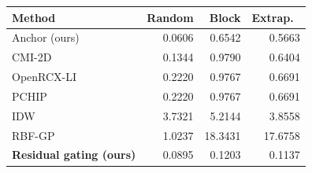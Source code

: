 \small
\begin{tabular}{lrrr}\toprule
Method & Random & Block & Extrap.\ \\\midrule
Anchor (ours) & 0.0606 & 0.6542 & 0.5663 \\
CMI-2D & 0.1344 & 0.9790 & 0.6404 \\
OpenRCX-LI & 0.2220 & 0.9767 & 0.6691 \\
PCHIP & 0.2220 & 0.9767 & 0.6691 \\
IDW & 3.7321 & 5.2144 & 3.8558 \\
RBF-GP & 1.0237 & 18.3431 & 17.6758 \\
\textbf{Residual gating (ours)} & 0.0895 & 0.1203 & 0.1137 \\
\bottomrule\end{tabular}
